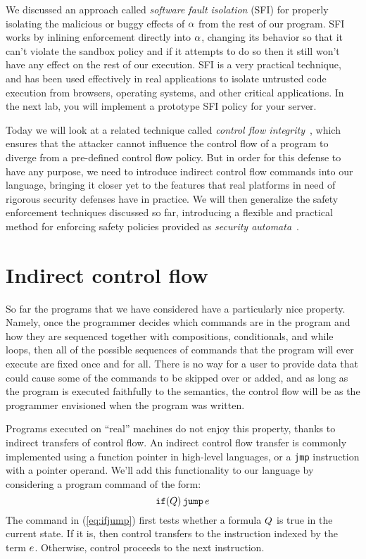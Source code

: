 \documentclass[11pt,twoside]{scrartcl}
\begin{document}
We discussed an approach called \emph{software fault isolation} (SFI) for properly isolating the malicious or buggy effects of $\alpha$ from the rest of our program. SFI works by inlining enforcement directly into $\alpha$, changing its behavior so that it can't violate the sandbox policy and if it attempts to do so then it still won't have any effect on the rest of our execution. SFI is a very practical technique, and has been used effectively in real applications to isolate untrusted code execution from browsers, operating systems, and other critical applications. In the next lab, you will implement a prototype SFI policy for your server.

Today we will look at a related technique called \emph{control flow integrity}~\cite{Abadi2009}, which ensures that the attacker cannot influence the control flow of a program to diverge from a pre-defined control flow policy. But in order for this defense to have any purpose, we need to introduce indirect control flow commands into our language, bringing it closer yet to the features that real platforms in need of rigorous security defenses have in practice. We will then generalize the safety enforcement techniques discussed so far, introducing a flexible and practical method for enforcing safety policies provided as \emph{security automata}~\cite{Schneider2000}.


\section{Indirect control flow}
So far the programs that we have considered have a particularly nice property. Namely, once the programmer decides which commands are in the program and how they are sequenced together with compositions, conditionals, and while loops, then all of the possible sequences of commands that the program will ever execute are fixed once and for all. There is no way for a user to provide data that could cause some of the commands to be skipped over or added, and as long as the program is executed faithfully to the semantics, the control flow will be as the programmer envisioned when the program was written.

Programs executed on ``real'' machines do not enjoy this property, thanks to indirect transfers of control flow. An indirect control flow transfer is commonly implemented using a function pointer in high-level languages, or a \verb'jmp' instruction with a pointer operand. We'll add this functionality to our language by considering a program command of the form:
\begin{equation}
\label{eq:ifjump}
\pifjump{\ivr}{\astrm}
\end{equation}
The command in (\ref{eq:ifjump}) first tests whether a formula $Q$ is true in the current state. If it is, then control transfers to the instruction indexed by the term $e$. Otherwise, control proceeds to the next instruction.
\end{document}
